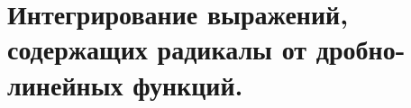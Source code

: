 \documentclass[../main.tex]{subfiles}
\begin{document}
\newpage
\section{Интегрирование выражений, содержащих радикалы от дробно-линейных функций.}
\end{document}
